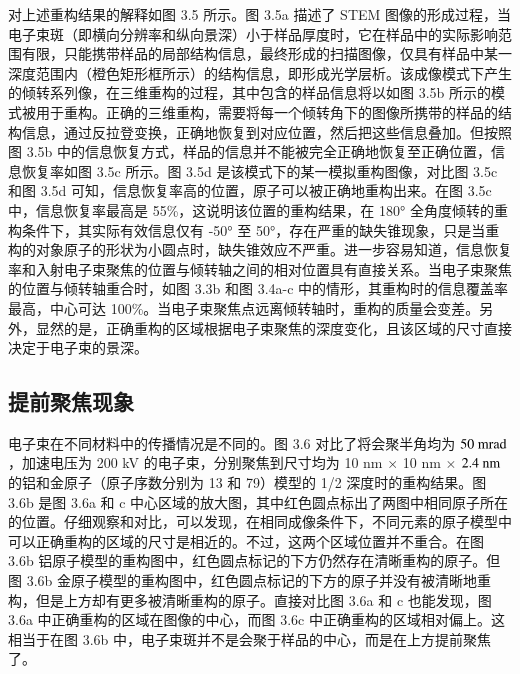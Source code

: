 对上述重构结果的解释如图 3.5 所示。图 3.5a 描述了 STEM 图像的形成过程，当电子束斑（即横向分辨率和纵向景深）小于样品厚度时，它在样品中的实际影响范围有限，只能携带样品的局部结构信息，最终形成的扫描图像，仅具有样品中某一深度范围内（橙色矩形框所示）的结构信息，即形成光学层析。该成像模式下产生的倾转系列像，在三维重构的过程，其中包含的样品信息将以如图 3.5b 所示的模式被用于重构。正确的三维重构，需要将每一个倾转角下的图像所携带的样品的结构信息，通过反拉登变换，正确地恢复到对应位置，然后把这些信息叠加。但按照图 3.5b 中的信息恢复方式，样品的信息并不能被完全正确地恢复至正确位置，信息恢复率如图 3.5c 所示。图 3.5d 是该模式下的某一模拟重构图像，对比图 3.5c 和图 3.5d 可知，信息恢复率高的位置，原子可以被正确地重构出来。在图 3.5c 中，信息恢复率最高是 55\%，这说明该位置的重构结果，在 180° 全角度倾转的重构条件下，其实际有效信息仅有 -50° 至 50°，存在严重的缺失锥现象，只是当重构的对象原子的形状为小圆点时，缺失锥效应不严重。进一步容易知道，信息恢复率和入射电子束聚焦的位置与倾转轴之间的相对位置具有直接关系。当电子束聚焦的位置与倾转轴重合时，如图 3.3b 和图 3.4a-c 中的情形，其重构时的信息覆盖率最高，中心可达 100\%。当电子束聚焦点远离倾转轴时，重构的质量会变差。另外，显然的是，正确重构的区域根据电子束聚焦的深度变化，且该区域的尺寸直接决定于电子束的景深。



\subsection{提前聚焦现象}
电子束在不同材料中的传播情况是不同的。图 3.6 对比了将会聚半角均为 $\textnormal{50 mrad}$，加速电压为 200 kV 的电子束，分别聚焦到尺寸均为 10 nm $\times$ 10 nm $\times$ $2.4\textnormal{ nm}$ 的铝和金原子（原子序数分别为 13 和 79）模型的 1/2 深度时的重构结果。图 3.6b 是图 3.6a 和 c 中心区域的放大图，其中红色圆点标出了两图中相同原子所在的位置。仔细观察和对比，可以发现，在相同成像条件下，不同元素的原子模型中可以正确重构的区域的尺寸是相近的。不过，这两个区域位置并不重合。在图 3.6b 铝原子模型的重构图中，红色圆点标记的下方仍然存在清晰重构的原子。但图 3.6b 金原子模型的重构图中，红色圆点标记的下方的原子并没有被清晰地重构，但是上方却有更多被清晰重构的原子。直接对比图 3.6a 和 c 也能发现，图 3.6a 中正确重构的区域在图像的中心，而图 3.6c 中正确重构的区域相对偏上。这相当于在图 3.6b 中，电子束斑并不是会聚于样品的中心，而是在上方提前聚焦了。  

